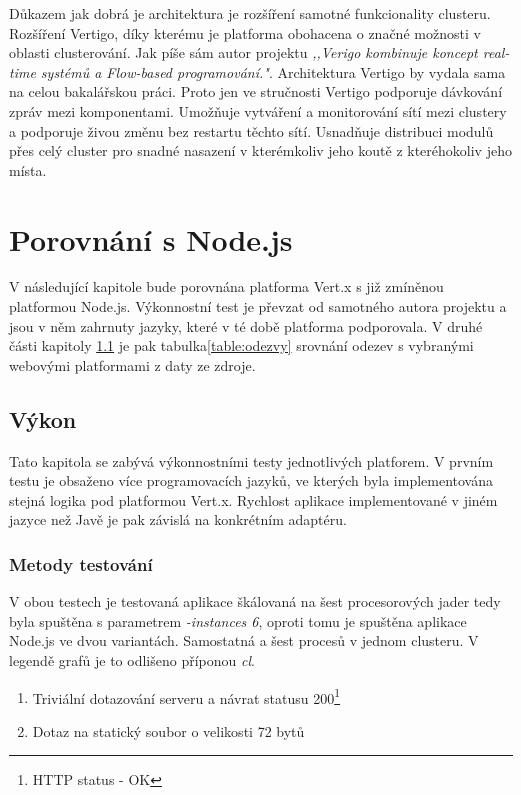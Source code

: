 Důkazem jak dobrá je architektura je rozšíření samotné funkcionality clusteru. Rozšíření Vertigo\cite{vertigo}, díky kterému je platforma obohacena o značné možnosti v oblasti clusterování. Jak píše sám autor projektu \emph{,,Verigo kombinuje koncept real-time systémů a Flow-based programování."}. Architektura Vertigo by vydala sama na celou bakalářskou práci. Proto jen ve stručnosti Vertigo podporuje dávkování zpráv mezi komponentami. Umožňuje vytváření a monitorování sítí mezi clustery a podporuje živou změnu bez restartu těchto sítí. Usnadňuje distribuci modulů přes celý cluster pro snadné nasazení v kterémkoliv jeho koutě z kteréhokoliv jeho místa.

\section{Porovnání s Node.js}

V následující kapitole bude porovnána platforma Vert.x s již zmíněnou platformou Node.js. Výkonnostní test\cite{benchmarkTim} je převzat od samotného autora projektu a jsou v něm zahrnuty jazyky, které v té době platforma podporovala. V druhé části kapitoly \ref{sub:performence} je pak tabulka\ref{table:odezvy} srovnání odezev s vybranými webovými platformami z daty ze zdroje\cite{benchmark}.

\subsection{Výkon}\label{sub:performence}

Tato kapitola se zabývá výkonnostními testy jednotlivých platforem. V prvním testu je obsaženo více programovacích jazyků, ve kterých byla implementována stejná logika pod platformou Vert.x. Rychlost aplikace implementované v jiném jazyce než Javě je pak závislá na konkrétním adaptéru.

\subsubsection{Metody testování}

V obou testech je testovaná aplikace škálovaná na šest procesorových jader tedy byla spuštěna s parametrem \emph{-instances 6}, oproti tomu je spuštěna aplikace Node.js ve dvou variantách. Samostatná a šest procesů v jednom clusteru. V legendě grafů je to odlišeno příponou \emph{cl}.

\begin{enumerate}
\item{Triviální dotazování serveru a návrat statusu 200\footnote{HTTP status - OK}}
\item{Dotaz na statický soubor o velikosti 72 bytů}
\end{enumerate}

